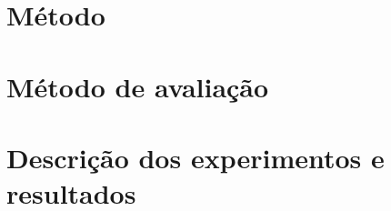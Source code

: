 \section{Método}
\label{cha:metodo}
	

\section{Método de avaliação}
\label{cha:avaliacao_parceval}
	

\section{Descrição dos experimentos e resultados}
\label{cha:experimentos}
	

%	

